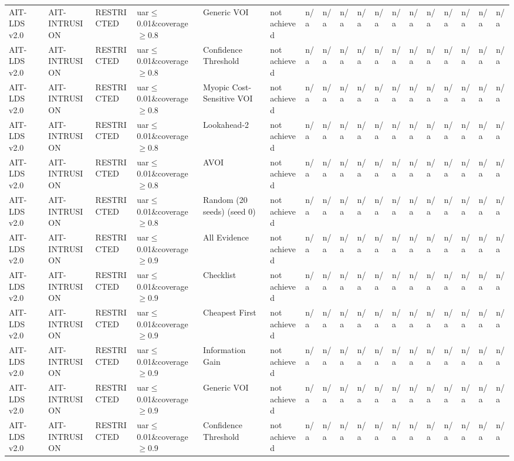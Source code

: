 \begin{table}[!ht]
{\begin{tabular}{llllllllllllllllll}
AIT-LDS v2.0 & AIT-INTRUSION & RESTRICTED & uar$\le$0.01\&coverage$\ge$0.8 & Generic VOI & not achieved & n/a & n/a & n/a & n/a & n/a & n/a & n/a & n/a & n/a & n/a & n/a & n/a \\
AIT-LDS v2.0 & AIT-INTRUSION & RESTRICTED & uar$\le$0.01\&coverage$\ge$0.8 & Confidence Threshold & not achieved & n/a & n/a & n/a & n/a & n/a & n/a & n/a & n/a & n/a & n/a & n/a & n/a \\
AIT-LDS v2.0 & AIT-INTRUSION & RESTRICTED & uar$\le$0.01\&coverage$\ge$0.8 & Myopic Cost-Sensitive VOI & not achieved & n/a & n/a & n/a & n/a & n/a & n/a & n/a & n/a & n/a & n/a & n/a & n/a \\
AIT-LDS v2.0 & AIT-INTRUSION & RESTRICTED & uar$\le$0.01\&coverage$\ge$0.8 & Lookahead-2 & not achieved & n/a & n/a & n/a & n/a & n/a & n/a & n/a & n/a & n/a & n/a & n/a & n/a \\
AIT-LDS v2.0 & AIT-INTRUSION & RESTRICTED & uar$\le$0.01\&coverage$\ge$0.8 & AVOI & not achieved & n/a & n/a & n/a & n/a & n/a & n/a & n/a & n/a & n/a & n/a & n/a & n/a \\
AIT-LDS v2.0 & AIT-INTRUSION & RESTRICTED & uar$\le$0.01\&coverage$\ge$0.8 & Random (20 seeds) (seed 0) & not achieved & n/a & n/a & n/a & n/a & n/a & n/a & n/a & n/a & n/a & n/a & n/a & n/a \\
AIT-LDS v2.0 & AIT-INTRUSION & RESTRICTED & uar$\le$0.01\&coverage$\ge$0.9 & All Evidence & not achieved & n/a & n/a & n/a & n/a & n/a & n/a & n/a & n/a & n/a & n/a & n/a & n/a \\
AIT-LDS v2.0 & AIT-INTRUSION & RESTRICTED & uar$\le$0.01\&coverage$\ge$0.9 & Checklist & not achieved & n/a & n/a & n/a & n/a & n/a & n/a & n/a & n/a & n/a & n/a & n/a & n/a \\
AIT-LDS v2.0 & AIT-INTRUSION & RESTRICTED & uar$\le$0.01\&coverage$\ge$0.9 & Cheapest First & not achieved & n/a & n/a & n/a & n/a & n/a & n/a & n/a & n/a & n/a & n/a & n/a & n/a \\
AIT-LDS v2.0 & AIT-INTRUSION & RESTRICTED & uar$\le$0.01\&coverage$\ge$0.9 & Information Gain & not achieved & n/a & n/a & n/a & n/a & n/a & n/a & n/a & n/a & n/a & n/a & n/a & n/a \\
AIT-LDS v2.0 & AIT-INTRUSION & RESTRICTED & uar$\le$0.01\&coverage$\ge$0.9 & Generic VOI & not achieved & n/a & n/a & n/a & n/a & n/a & n/a & n/a & n/a & n/a & n/a & n/a & n/a \\
AIT-LDS v2.0 & AIT-INTRUSION & RESTRICTED & uar$\le$0.01\&coverage$\ge$0.9 & Confidence Threshold & not achieved & n/a & n/a & n/a & n/a & n/a & n/a & n/a & n/a & n/a & n/a & n/a & n/a \\

\end{tabular}}
\end{table}

